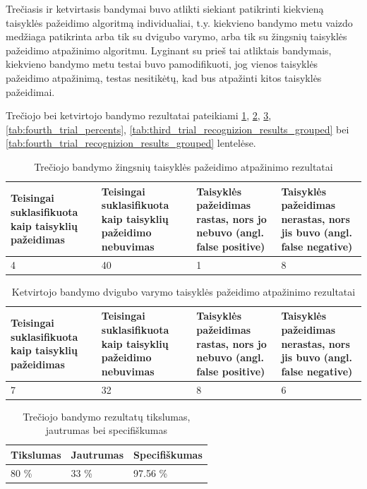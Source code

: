 \documentclass{VUMIFPSbakalaurinis}
\begin{document}
Trečiasis ir ketvirtasis bandymai buvo atlikti siekiant patikrinti kiekvieną taisyklės pažeidimo algoritmą individualiai, t.y. kiekvieno bandymo metu vaizdo medžiaga patikrinta arba tik su dvigubo varymo, arba tik su žingsnių taisyklės pažeidimo atpažinimo algoritmu. Lyginant su prieš tai atliktais bandymais, kiekvieno bandymo metu testai buvo pamodifikuoti, jog vienos taisyklės pažeidimo atpažinimą, testas nesitikėtų, kad bus atpažinti kitos taisyklės pažeidimai. 

Trečiojo bei ketvirtojo bandymo rezultatai pateikiami \ref{tab:third_trial}, \ref{tab:fourth_trial}, \ref{tab:third_trial_percents}, \ref{tab:fourth_trial_percents}, \ref{tab:third_trial_recognizion_results_grouped} bei \ref{tab:fourth_trial_recognizion_results_grouped} lentelėse. 

\begin{table}[H]\footnotesize
	\centering
	\caption{Trečiojo bandymo žingsnių taisyklės pažeidimo atpažinimo rezultatai}
	{\begin{tabular}{|p{3cm}|p{3cm}|p{3cm}|p{2cm}|} \hline
			\textbf{Teisingai suklasifikuota kaip taisyklių pažeidimas} & \textbf{Teisingai suklasifikuota kaip taisyklių pažeidimo nebuvimas} & \textbf{Taisyklės pažeidimas rastas, nors jo nebuvo (angl. false positive)} & \textbf{Taisyklės pažeidimas nerastas, nors jis buvo (angl. false negative)} \\
			\hline
			4  & 40    & 1    & 8      \\
			\hline
	\end{tabular}}
	\label{tab:third_trial}
\end{table}

\begin{table}[H]\footnotesize
	\centering
	\caption{Ketvirtojo bandymo dvigubo varymo taisyklės pažeidimo atpažinimo rezultatai}
	{\begin{tabular}{|p{3cm}|p{3cm}|p{3cm}|p{2cm}|} \hline
			\textbf{Teisingai suklasifikuota kaip taisyklių pažeidimas} & \textbf{Teisingai suklasifikuota kaip taisyklių pažeidimo nebuvimas} & \textbf{Taisyklės pažeidimas rastas, nors jo nebuvo (angl. false positive)} & \textbf{Taisyklės pažeidimas nerastas, nors jis buvo (angl. false negative)} \\
			\hline
			7  & 32    & 8    & 6   \\
			\hline
	\end{tabular}}
	\label{tab:fourth_trial}
\end{table}

\begin{table}[H]\footnotesize
	\centering
	\caption{Trečiojo bandymo rezultatų tikslumas, jautrumas bei specifiškumas}
	{\begin{tabular}{|p{5cm}|p{5cm}|p{5cm}|} \hline
			\textbf{Tikslumas} & \textbf{Jautrumas} & \textbf{Specifiškumas} \\
			\hline
			80 \%  & 33 \%    & 97.56 \%    \\
			
			\hline
	\end{tabular}}
	\label{tab:third_trial_percents}
\end{table}
\end{document}
